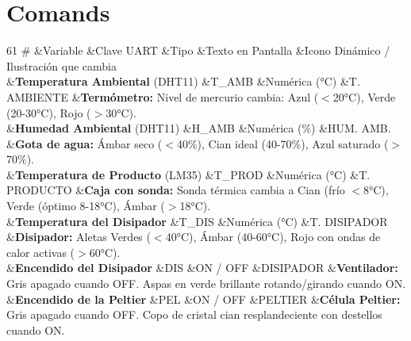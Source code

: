 \chapter{Comands }
\hypertarget{md_src_2_comands}{}\label{md_src_2_comands}

\begin{DoxyTable}{6}{}{}{1}
\#  &Variable  &Clave UART  &Tipo  &Texto en Pantalla  &Icono Dinámico / Ilustración que cambia  \\
  &{\bfseries{Temperatura Ambiental}} (DHT11)  &{\ttfamily T\+\_\+\+AMB}  &Numérica (°C)  &{\ttfamily T. AMBIENTE}  &{\bfseries{Termómetro:}} Nivel de mercurio cambia: Azul (\texorpdfstring{$<$}{<}20°C), Verde (20-\/30°C), Rojo (\texorpdfstring{$>$}{>}30°C).  \\
  &{\bfseries{Humedad Ambiental}} (DHT11)  &{\ttfamily H\+\_\+\+AMB}  &Numérica (\%)  &{\ttfamily HUM. AMB.}  &{\bfseries{Gota de agua:}} Ámbar seco (\texorpdfstring{$<$}{<}40\%), Cian ideal (40-\/70\%), Azul saturado (\texorpdfstring{$>$}{>}70\%).  \\
  &{\bfseries{Temperatura de Producto}} (LM35)  &{\ttfamily T\+\_\+\+PROD}  &Numérica (°C)  &{\ttfamily T. PRODUCTO}  &{\bfseries{Caja con sonda:}} Sonda térmica cambia a Cian (frío \texorpdfstring{$<$}{<}8°C), Verde (óptimo 8-\/18°C), Ámbar (\texorpdfstring{$>$}{>}18°C).  \\
  &{\bfseries{Temperatura del Disipador}}  &{\ttfamily T\+\_\+\+DIS}  &Numérica (°C)  &{\ttfamily T. DISIPADOR}  &{\bfseries{Disipador:}} Aletas Verdes (\texorpdfstring{$<$}{<}40°C), Ámbar (40-\/60°C), Rojo con ondas de calor activas (\texorpdfstring{$>$}{>}60°C).  \\
  &{\bfseries{Encendido del Disipador}}  &{\ttfamily DIS}  &ON / OFF  &{\ttfamily DISIPADOR}  &{\bfseries{Ventilador:}} Gris apagado cuando OFF. Aspas en verde brillante rotando/\+girando cuando ON.  \\
  &{\bfseries{Encendido de la Peltier}}  &{\ttfamily PEL}  &ON / OFF  &{\ttfamily PELTIER}  &{\bfseries{Célula Peltier:}} Gris apagado cuando OFF. Copo de cristal cian resplandeciente con destellos cuando ON.  \\

\end{DoxyTable}
